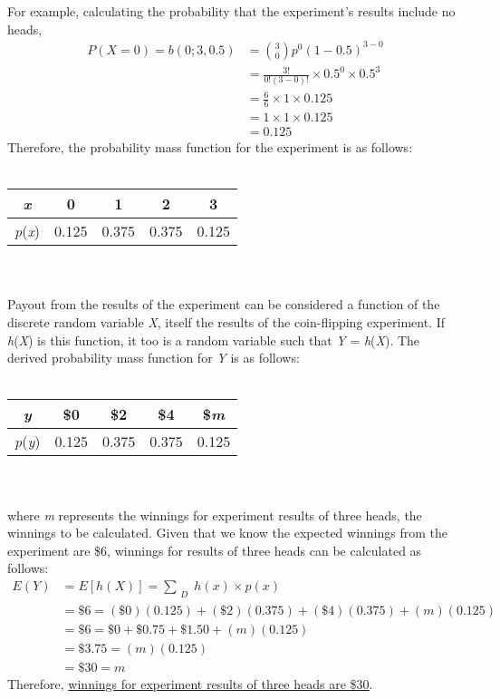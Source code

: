 \documentclass[12pt,a4paper]{article}
\numberwithin{equation}{subsection}
\def\doubleunderline#1{\underline{\underline{#1}}}
\begin{document}
\begin{enumerate}
For example, calculating the probability that the experiment's results include no heads,
\begin{equation*}
\begin{split}
P(X = 0) = b(0; 3, 0.5) & = \binom{3}{0}p^{0}(1 - 0.5)^{3 - 0} \\
& = \frac{3!}{0!(3 - 0)!} \times 0.5^{0} \times 0.5^{3} \\
& = \frac{6}{6} \times 1 \times 0.125 \\
& = 1 \times 1 \times 0.125 \\
& = 0.125
\end{split}
\end{equation*}
Therefore, the probability mass function for the experiment is as follows: \\ \\
\begin{tabular}{c|cccc}
\textit{x} & 0 & 1 & 2 & 3 \\
\hline
\textit{p}(\textit{x}) & 0.125 & 0.375 & 0.375 & 0.125 \\
\end{tabular} \\ \\
Payout from the results of the experiment can be considered a function of the discrete random variable \textit{X}, itself the results of the coin-flipping experiment.  If \textit{h}(\textit{X}) is this function, it too is a random variable such that \textit{Y} = \textit{h}(\textit{X}).  The derived probability mass function for \textit{Y} is as follows: \\ \\
\begin{tabular}{c|cccc}
\textit{y} & \$0 & \$2 & \$4 & \$\textit{m} \\
\hline
\textit{p}(\textit{y}) & 0.125 & 0.375 & 0.375 & 0.125 \\
\end{tabular} \\ \\
where \textit{m} represents the winnings for experiment results of three heads, the winnings to be calculated.  Given that we know the expected winnings from the experiment are \$6, winnings for results of three heads can be calculated as follows:
\begin{equation*}
\begin{split}
E(Y) & = E[h(X)] = \sum_{\substack{D}}h(x) \times p(x) \\
& = \$6 = (\$0)(0.125) + (\$2)(0.375) + (\$4)(0.375) + (\textit{m})(0.125) \\
& = \$6 = \$0 + \$0.75 + \$1.50 + (\textit{m})(0.125) \\
& = \$3.75 = (\textit{m})(0.125) \\
& = \$30 = \textit{m}
\end{split}
\end{equation*}
Therefore, \doubleunderline{winnings for experiment results of three heads are \$30}.


\end{enumerate}
\end{document}
